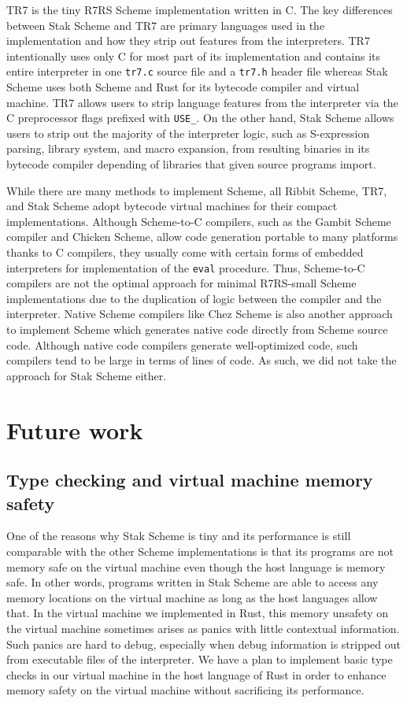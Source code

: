 \documentclass[sigplan]{acmart}
\begin{document}
TR7 \cite{tr7} is the tiny R7RS Scheme implementation written in C.
The key differences between Stak Scheme and TR7 are primary languages used in
the implementation and how they strip out features from the
interpreters.
TR7 intentionally uses only C for most part of its implementation and
contains its entire interpreter in one \texttt{tr7.c} source file and a
\texttt{tr7.h} header file whereas Stak Scheme uses both Scheme and
Rust for its bytecode compiler and virtual machine.
TR7 allows users to strip language features from the interpreter via
the C preprocessor flags prefixed with \texttt{USE\_}.
On the other hand, Stak Scheme allows users to strip out the majority of
the interpreter logic, such as S-expression parsing, library system, and
macro expansion, from resulting binaries in its bytecode compiler
depending of libraries that given source programs import.

While there are many methods to implement Scheme, all Ribbit Scheme,
TR7, and Stak Scheme adopt bytecode virtual machines for their
compact implementations.
Although Scheme-to-C compilers, such as the Gambit Scheme compiler and
Chicken Scheme, allow code generation portable to many platforms
thanks to C compilers, they usually come with certain forms of embedded
interpreters for implementation of the \texttt{eval} procedure.
Thus, Scheme-to-C compilers are not the optimal approach for minimal
R7RS-small Scheme implementations due to the duplication of logic between the
compiler and the interpreter.
Native Scheme compilers like Chez Scheme is also another approach to
implement Scheme which generates native code directly from Scheme source code.
Although native code compilers generate well-optimized code, such
compilers tend to be large in terms of lines of code.
As such, we did not take the approach for Stak Scheme either.

\section{Future work}

\subsection{Type checking and virtual machine memory safety}

One of the reasons why Stak Scheme is tiny and its performance is still
comparable with the other Scheme implementations is that its
programs are not memory safe on the virtual machine even though
the host language is memory safe.
In other words, programs written in Stak Scheme are able to access any memory
locations on the virtual machine as long as the host languages allow that.
In the virtual machine we implemented in Rust, this memory
unsafety on the virtual machine sometimes arises as panics with little
contextual information.
Such panics are hard to debug, especially when debug information is
stripped out from executable files of the interpreter.
We have a plan to implement basic type checks in our virtual machine
in the host language of Rust in order to enhance memory safety on
the virtual machine without sacrificing its performance.
\end{document}
